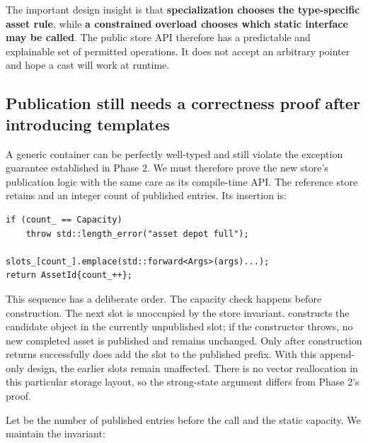 The important design insight is that \textbf{specialization chooses the type-specific asset rule}, while \textbf{a constrained overload chooses which static interface may be called}. The public store API therefore has a predictable and explainable set of permitted operations. It does not accept an arbitrary pointer and hope a cast will work at runtime.

\subsection{Publication still needs a correctness proof after introducing templates}\label{05-engine-i-ch005-publication-still-needs-a-correctness-proof-after-introducing-templates}

\hypertarget{05-engine-i-ch005-publication-still-needs-a-correctness-proof-after-introducing-templates}{}

A generic container can be perfectly well-typed and still violate the exception guarantee established in Phase 2. We must therefore prove the new store's publication logic with the same care as its compile-time API. The reference store retains  and an integer count of published entries. Its insertion is:

\begin{verbatim}
if (count_ == Capacity)
    throw std::length_error("asset depot full");

slots_[count_].emplace(std::forward<Args>(args)...);
return AssetId{count_++};
\end{verbatim}

This sequence has a deliberate order. The capacity check happens before construction. The next slot is unoccupied by the store invariant.  constructs the candidate object in the currently unpublished slot; if the constructor throws, no new completed asset is published and  remains unchanged. Only after construction returns successfully does  add the slot to the published prefix. With this append-only design, the earlier slots remain unaffected. There is no vector reallocation in this particular storage layout, so the strong-state argument differs from Phase 2's  proof.

Let  be the number of published entries before the call and  the static capacity. We maintain the invariant:

